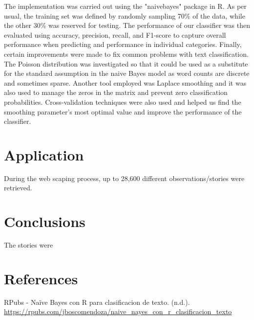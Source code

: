 \documentclass[twocolumn]{article}
\begin{document}
The implementation was carried out using the "naivebayes" package in R. As per usual, the training set was defined by randomly sampling 70\% of the data, while the other 30\% was reserved for testing. The performance of our classifier was then evaluated using accuracy, precision, recall, and F1-score to capture overall performance when predicting and performance in individual categories.
Finally, certain improvements were made to fix common problems with text classification.  The Poisson distribution was investigated so that it could be used as a substitute for the standard assumption in the naive Bayes model as word counts are discrete and sometimes sparse. Another tool employed was Laplace smoothing and it was also used to manage the zeros in the matrix and prevent zero classification probabilities. Cross-validation techniques were also used and helped us find the smoothing parameter's most optimal value and improve the performance of the classifier.



\section{Application}
During the web scaping process, up to 28,600 different observations/stories were retrieved. 

\section{Conclusions}
The stories were 


\section{References}

\begin{thebibliography}{9}
\setlength{\itemsep}{0pt}
\setlength{\parskip}{0pt}


RPubs - Naïve Bayes con R para clasificacion de texto. (n.d.).
\url{https://rpubs.com/jboscomendoza/naive_nayes_con_r_clasificacion_texto}

\vspace{0.3cm}


\end{thebibliography}
\end{document}
